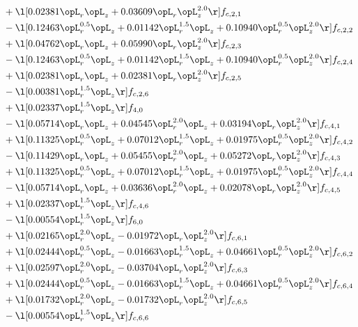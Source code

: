 \begin{alignat}{2}
& + \l[  0.02381 \opL_r \opL_z +  0.03609 \opL_r \opL_z^{2.0}  \r] f_{c,2,1} \nonumber \\ 
& - \l[  0.12463 \opL_r^{0.5} \opL_z +  0.01142 \opL_r^{1.5} \opL_z +  0.10940 \opL_r^{0.5} \opL_z^{2.0}  \r] f_{c,2,2} \nonumber \\ 
& + \l[  0.04762 \opL_r \opL_z +  0.05990 \opL_r \opL_z^{2.0}  \r] f_{c,2,3} \nonumber \\ 
& - \l[  0.12463 \opL_r^{0.5} \opL_z +  0.01142 \opL_r^{1.5} \opL_z +  0.10940 \opL_r^{0.5} \opL_z^{2.0}  \r] f_{c,2,4} \nonumber \\ 
& + \l[  0.02381 \opL_r \opL_z +  0.02381 \opL_r \opL_z^{2.0}  \r] f_{c,2,5} \nonumber \\ 
& - \l[  0.00381 \opL_r^{1.5} \opL_z  \r] f_{c,2,6} \nonumber \\ 
& + \l[  0.02337 \opL_r^{1.5} \opL_z  \r] f_{4,0} \nonumber \\ 
& - \l[  0.05714 \opL_r \opL_z +  0.04545 \opL_r^{2.0} \opL_z +  0.03194 \opL_r \opL_z^{2.0}  \r] f_{c,4,1} \nonumber \\ 
& + \l[  0.11325 \opL_r^{0.5} \opL_z +  0.07012 \opL_r^{1.5} \opL_z +  0.01975 \opL_r^{0.5} \opL_z^{2.0}  \r] f_{c,4,2} \nonumber \\ 
& - \l[  0.11429 \opL_r \opL_z +  0.05455 \opL_r^{2.0} \opL_z +  0.05272 \opL_r \opL_z^{2.0}  \r] f_{c,4,3} \nonumber \\ 
& + \l[  0.11325 \opL_r^{0.5} \opL_z +  0.07012 \opL_r^{1.5} \opL_z +  0.01975 \opL_r^{0.5} \opL_z^{2.0}  \r] f_{c,4,4} \nonumber \\ 
& - \l[  0.05714 \opL_r \opL_z +  0.03636 \opL_r^{2.0} \opL_z +  0.02078 \opL_r \opL_z^{2.0}  \r] f_{c,4,5} \nonumber \\ 
& + \l[  0.02337 \opL_r^{1.5} \opL_z  \r] f_{c,4,6} \nonumber \\ 
& - \l[  0.00554 \opL_r^{1.5} \opL_z  \r] f_{6,0} \nonumber \\ 
& + \l[  0.02165 \opL_r^{2.0} \opL_z   -0.01972 \opL_r \opL_z^{2.0}  \r] f_{c,6,1} \nonumber \\ 
& + \l[  0.02444 \opL_r^{0.5} \opL_z   -0.01663 \opL_r^{1.5} \opL_z +  0.04661 \opL_r^{0.5} \opL_z^{2.0}  \r] f_{c,6,2} \nonumber \\ 
& + \l[  0.02597 \opL_r^{2.0} \opL_z   -0.03704 \opL_r \opL_z^{2.0}  \r] f_{c,6,3} \nonumber \\ 
& + \l[  0.02444 \opL_r^{0.5} \opL_z   -0.01663 \opL_r^{1.5} \opL_z +  0.04661 \opL_r^{0.5} \opL_z^{2.0}  \r] f_{c,6,4} \nonumber \\ 
& + \l[  0.01732 \opL_r^{2.0} \opL_z   -0.01732 \opL_r \opL_z^{2.0}  \r] f_{c,6,5} \nonumber \\ 
& - \l[  0.00554 \opL_r^{1.5} \opL_z  \r] f_{c,6,6} \nonumber \\ 
\end{alignat} 


